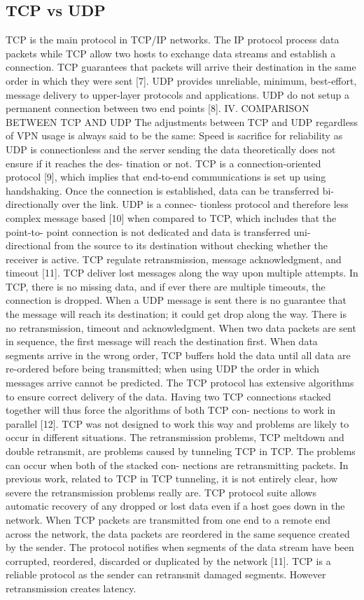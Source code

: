 \subsection{TCP vs UDP}

TCP is the main protocol in TCP/IP networks. The IP protocol process data packets while TCP allow two hosts to exchange data streams and establish a connection. TCP guarantees that packets will arrive their destination in the same order in which they were sent [7].
UDP provides unreliable, minimum, best-effort, message delivery to upper-layer protocols and applications. UDP do not setup a permanent connection between two end points [8].
IV. COMPARISON BETWEEN TCP AND UDP
The adjustments between TCP and UDP regardless of VPN usage is always said to be the same: Speed is sacrifice for reliability as UDP is connectionless and the server sending the data theoretically does not ensure if it reaches the des- tination or not. TCP is a connection-oriented protocol [9], which implies that end-to-end communications is set up using handshaking. Once the connection is established, data can be transferred bi-directionally over the link. UDP is a connec- tionless protocol and therefore less complex message based [10] when compared to TCP, which includes that the point-to- point connection is not dedicated and data is transferred uni- directional from the source to its destination without checking whether the receiver is active. TCP regulate retransmission, message acknowledgment, and timeout [11]. TCP deliver lost messages along the way upon multiple attempts. In TCP, there is no missing data, and if ever there are multiple timeouts, the connection is dropped. When a UDP message is sent there is no guarantee that the message will reach its destination; it could get drop along the way. There is no retransmission, timeout and acknowledgment. When two data packets are sent in sequence, the first message will reach the destination first. When data segments arrive in the wrong order, TCP buffers hold the data until all data are re-ordered before being transmitted; when using UDP the order in which messages arrive cannot be predicted.
The TCP protocol has extensive algorithms to ensure correct delivery of the data. Having two TCP connections stacked together will thus force the algorithms of both TCP con- nections to work in parallel [12]. TCP was not designed to work this way and problems are likely to occur in different situations. The retransmission problems, TCP meltdown and double retransmit, are problems caused by tunneling TCP in TCP. The problems can occur when both of the stacked con- nections are retransmitting packets. In previous work, related to TCP in TCP tunneling, it is not entirely clear, how severe the retransmission problems really are. TCP protocol suite allows automatic recovery of any dropped or lost data even if a host goes down in the network. When TCP packets are transmitted from one end to a remote end across the network, the data packets are reordered in the same sequence created by the sender. The protocol notifies when segments of the data stream have been corrupted, reordered, discarded or duplicated by the network [11]. TCP is a reliable protocol as the sender can retransmit damaged segments. However retransmission creates latency.
